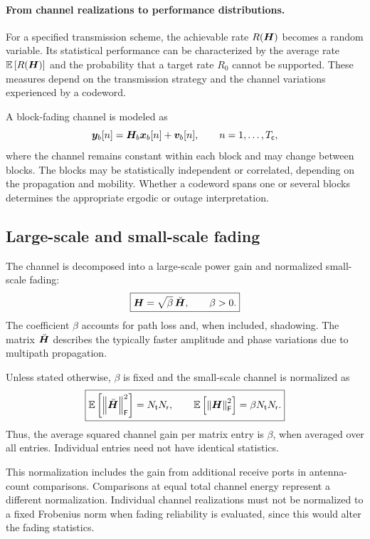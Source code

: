 \paragraph{From channel realizations to performance distributions.}
For a specified transmission scheme, the achievable rate
$R(\bm{H})$ becomes a random variable.
Its statistical performance can be characterized by
the average rate $\mathbb{E}\left[R(\bm{H})\right]$ and the probability
that a target rate $R_0$ cannot be supported.
These measures depend on the transmission strategy
and the channel variations experienced by a codeword.

A block-fading channel is modeled as
\begin{equation}
	\bm{y}_b[n]
	=\bm{H}_b\bm{x}_b[n]+\bm{v}_b[n],
	\qquad n=1,\ldots,T_{\mathsf c},
\end{equation}
where the channel remains constant within each block
and may change between blocks.
The blocks may be statistically independent or correlated,
depending on the propagation and mobility.
Whether a codeword spans one or several blocks determines
the appropriate ergodic or outage interpretation.

\subsection{Large-scale and small-scale fading}

The channel is decomposed into a large-scale power gain
and normalized small-scale fading:
\begin{equation}\label{eq:beta}
	\boxed{
		\bm{H}=\sqrt{\beta}\,\breve{\bm{H}},
		\qquad \beta>0.
	}
\end{equation}
The coefficient $\beta$ accounts for path loss and,
when included, shadowing.
The matrix $\breve{\bm{H}}$ describes the typically
faster amplitude and phase variations due to multipath
propagation.

Unless stated otherwise, $\beta$ is fixed and
the small-scale channel is normalized as
\begin{equation}\label{eq:normalization}
	\boxed{
		\mathbb{E}\left[\left\|\breve{\bm{H}}\right\|_{\mathsf{F}}^2\right]=N_{\mathsf{t}}N_{\mathsf{r}},
		\qquad
		\mathbb{E}\left[\left\|\bm{H}\right\|_{\mathsf{F}}^2\right]=\beta N_{\mathsf{t}}N_{\mathsf{r}}.
	}
\end{equation}
Thus, the average squared channel gain per matrix
entry is $\beta$, when averaged over all entries.
Individual entries need not have identical statistics.

This normalization includes the gain from additional
receive ports in antenna-count comparisons.
Comparisons at equal total channel energy represent
a different normalization.
Individual channel realizations must not be normalized
to a fixed Frobenius norm when fading reliability
is evaluated, since this would alter the fading statistics.

